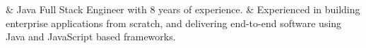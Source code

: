 \documentclass[flowWeaver.tex]{subfiles}
\begin{document}
	\begin{easylist}[itemize]
		& Java Full Stack Engineer with 8 years of experience.
		& Experienced in building enterprise applications from scratch, and delivering end-to-end software using Java
		and JavaScript based frameworks.
	\end{easylist}
\end{document}
